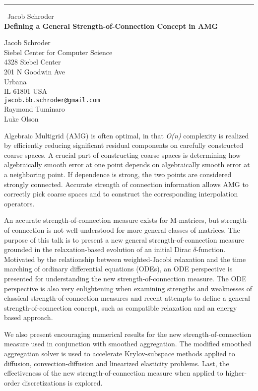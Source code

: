 \documentclass{report}
\begin{document}
\begin{center}
\rule{6in}{1pt} \
{\large Jacob Schroder \\
{\bf Defining a General Strength-of-Connection Concept in AMG}}

Jacob Schroder \\ Siebel Center for Computer Science \\ 4328 Siebel Center \\ 201 N Goodwin Ave \\ Urbana \\ IL 61801 USA
\\
{\tt jacob.bb.schroder@gmail.com}\\
Raymond Tuminaro\\
Luke Olson\end{center}

Algebraic Multigrid (AMG) is often optimal, in that \emph{O(n)}
complexity is realized by efficiently reducing significant residual
components on carefully constructed coarse spaces. A crucial part of
constructing coarse spaces is determining how algebraically smooth error
at one point depends on algebraically smooth error at a neighboring
point. If dependence is strong, the two points are considered strongly
connected. Accurate strength of connection information allows AMG to
correctly pick coarse spaces and to construct the corresponding
interpolation operators.

An accurate strength-of-connection measure exists for M-matrices, but
strength-of-connection is not well-understood for more general classes of
matrices. The purpose of this talk is to present a new general
strength-of-connection measure grounded in the relaxation-based evolution
of an initial Dirac $\delta$-function. Motivated by the relationship
between weighted-Jacobi relaxation and the time marching of ordinary
differential equations (ODEs), an ODE perspective is presented for
understanding the new strength-of-connection measure. The ODE perspective
is also very enlightening when examining strengths and weaknesses of
classical strength-of-connection measures and recent attempts to define a
general strength-of-connection concept, such as compatible relaxation and
an energy based approach.

We also present encouraging numerical results for the new
strength-of-connection measure used in conjunction with smoothed
aggregation. The modified smoothed aggregation solver is used to
accelerate Krylov-subspace methods applied to diffusion,
convection-diffusion and linearized elasticity problems. Last, the
effectiveness of the new strength-of-connection measure when applied to
higher-order discretizations is explored.
\end{document}
